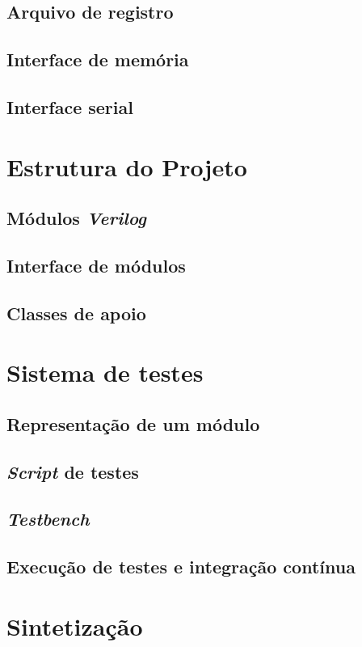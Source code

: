 \subsection{Arquivo de registro}
\label{ssec:memfile}

\subsection{Interface de memória}
\label{ssec:memint}

\subsection{Interface serial}
\label{ssec:serial}

\section{Estrutura do Projeto}
\label{sec:edp}

\subsection{Módulos \emph{Verilog}}
\label{ssec:mverilog}

\subsection{Interface de módulos}
\label{ssec:imdl}

\subsection{Classes de apoio}
\label{ssec:apoio}

\section{Sistema de testes}
\label{sec:sdt}

\subsection{Representação de um módulo}
\label{sec:rdm}

\subsection{\emph{Script} de testes}
\label{ssec:script}

\subsection{\emph{Testbench}}
\label{ssec:bench}

\subsection{Execução de testes e integração contínua}
\label{sec:edt}

\section{Sintetização}
\label{sec:sin}


